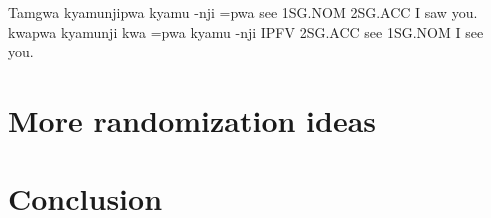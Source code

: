 \documentclass[a4paper,12pt,twoside,openright]{memoir}
\begin{document}
\begin{examples}
    \ex
    \lect Tamgwa
    \words {} kyamunjipwa
    \bits kyamu -nji =pwa
    \gloss see 1SG.NOM 2SG.ACC
    \tr I saw you.
    \ex
    \words {} kwapwa  kyamunji
    \bits kwa =pwa kyamu -nji
    \gloss IPFV 2SG.ACC see 1SG.NOM
    \tr I see you.
\end{examples}

\section*{More randomization ideas} %

\lipsum[7]

\section*{Conclusion} %

\lipsum[8]
\end{document}
